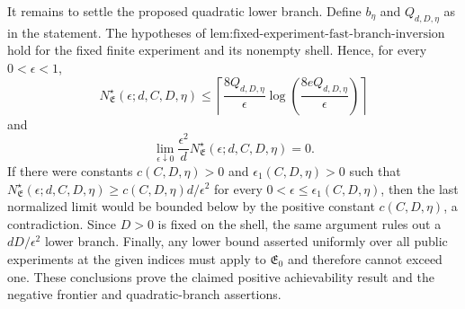It remains to settle the proposed quadratic lower branch. Define \(b_\eta\) and \(Q_{d,D,\eta}\) as in the statement. The hypotheses of \(\text{lem:fixed-experiment-fast-branch-inversion}\) hold for the fixed finite experiment and its nonempty shell. Hence, for every \(0<\epsilon<1\),
\[
N^\star_{\mathfrak E}(\epsilon;d,C,D,\eta)
\le
\left\lceil\frac{8Q_{d,D,\eta}}{\epsilon}
\log\!\left(\frac{8eQ_{d,D,\eta}}{\epsilon}\right)\right\rceil
\]
and
\[
\lim_{\epsilon\downarrow0}
\frac{\epsilon^2}{d}N^\star_{\mathfrak E}(\epsilon;d,C,D,\eta)=0.
\]
If there were constants \(c(C,D,\eta)>0\) and \(\epsilon_1(C,D,\eta)>0\) such that \(N^\star_{\mathfrak E}(\epsilon;d,C,D,\eta)\ge c(C,D,\eta)d/\epsilon^2\) for every \(0<\epsilon\le\epsilon_1(C,D,\eta)\), then the last normalized limit would be bounded below by the positive constant \(c(C,D,\eta)\), a contradiction. Since \(D>0\) is fixed on the shell, the same argument rules out a \(dD/\epsilon^2\) lower branch. Finally, any lower bound asserted uniformly over all public experiments at the given indices must apply to \(\mathfrak E_0\) and therefore cannot exceed one. These conclusions prove the claimed positive achievability result and the negative frontier and quadratic-branch assertions.